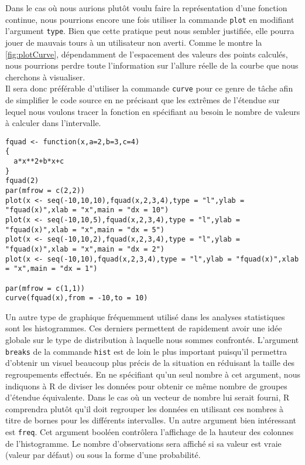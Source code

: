 \vspace{\baselineskip}
Dans le cas où nous aurions plutôt voulu faire la représentation d'une fonction continue, nous pourrions encore une fois utiliser la commande \texttt{plot} en modifiant l'argument \texttt{type}. Bien que cette pratique peut nous sembler justifiée, elle pourra jouer de mauvais tours à un utilisateur non averti. Comme le montre la \autoref{fig:plotCurve}, dépendamment de l'espacement des valeurs des points calculés, nous pourrions perdre toute l'information sur l'allure réelle de la courbe que nous cherchons à visualiser. \\

Il sera donc préférable d'utiliser la commande \texttt{curve} \cite{Rfunction:curve} pour ce genre de tâche afin de simplifier le code source en ne précisant que les extrêmes de l'étendue sur lequel nous voulons tracer la fonction en spécifiant au besoin le nombre de valeurs à calculer dans l'intervalle. \\

\begin{lstlisting}[caption = Utilisation de la commande \texttt{curve},label=src:plotCurve]
fquad <- function(x,a=2,b=3,c=4)
{
  a*x**2+b*x+c
}
fquad(2)
par(mfrow = c(2,2))
plot(x <- seq(-10,10,10),fquad(x,2,3,4),type = "l",ylab = "fquad(x)",xlab = "x",main = "dx = 10")
plot(x <- seq(-10,10,5),fquad(x,2,3,4),type = "l",ylab = "fquad(x)",xlab = "x",main = "dx = 5")
plot(x <- seq(-10,10,2),fquad(x,2,3,4),type = "l",ylab = "fquad(x)",xlab = "x",main = "dx = 2")
plot(x <- seq(-10,10),fquad(x,2,3,4),type = "l",ylab = "fquad(x)",xlab = "x",main = "dx = 1")

par(mfrow = c(1,1))
curve(fquad(x),from = -10,to = 10)
\end{lstlisting}



\vspace{\baselineskip}
Un autre type de graphique fréquemment utilisé dans les analyses statistiques sont les histogrammes. Ces derniers permettent de rapidement avoir une idée globale sur le type de distribution à laquelle nous sommes confrontés. L'argument \texttt{breaks} de la commande \texttt{hist} \cite{Rfunction:hist} est de loin le plus important puisqu'il permettra d'obtenir un visuel beaucoup plus précis de la situation en réduisant la taille des regroupements effectués. En ne spécifiant qu'un seul nombre à cet argument, nous indiquons à R de diviser les données pour obtenir ce même nombre de groupes d'étendue équivalente. Dans le cas où un vecteur de nombre lui serait fourni, R comprendra plutôt qu'il doit regrouper les données en utilisant ces nombres à titre de bornes pour les différents intervalles. Un autre argument bien intéressant est \texttt{freq}. Cet argument booléen contrôlera l'affichage de la hauteur des colonnes de l'histogramme. Le nombre d'observations sera affiché si sa valeur est vraie (valeur par défaut) ou sous la forme d'une probabilité. \\

